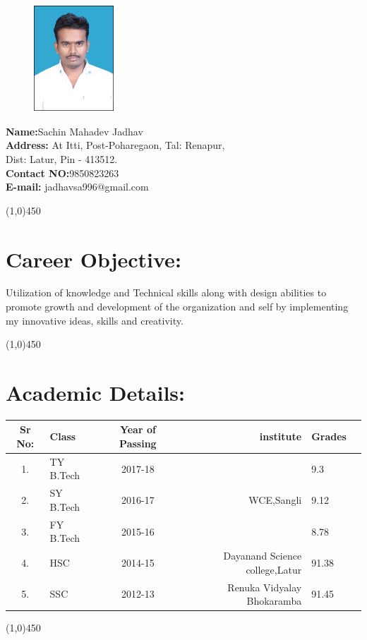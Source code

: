 \documentclass[16pt,a4paper]{article}
\begin{document}
 \begin{figure}
 	\vspace{-60pt}
    \includegraphics[width=3cm,height=4cm]{said.jpg}
 \end{figure}
		\textbf{Name:}Sachin Mahadev Jadhav\\
        \textbf{Address:} At Itti, Post-Poharegaon, Tal: Renapur,\\ Dist: Latur, Pin - 413512.\\
        \textbf{Contact NO:}9850823263\\
        \textbf{E-mail:} {jadhavsa996@gmail.com} 
       \begin{center}
       	 \line(1,0){450}
       \end{center}
     \section{Career Objective:} 
 	  Utilization of knowledge and Technical skills along with design abilities to promote growth and development of the organization and self by implementing my innovative ideas, skills and creativity.
   \begin{center}
   	\line(1,0){450}
   \end{center}
 \section{Academic Details:} 
\begin{tabular}{||c|l|c|r|l|l||}
	\hline
	Sr No:& Class & Year of Passing  & institute &Grades \\
	\hline
	1.&	TY B.Tech & 2017-18 &\multirow{3}{*}{WCE,Sangli}&9.3  \\
	2.&	SY B.Tech & 2016-17 &  &9.12 \\
	3.&	FY B.Tech & 2015-16 &  &8.78 \\
	4.&	HSC & 2014-15 & Dayanand Science college,Latur &91.38 \\
	5.&	SSC & 2012-13 & Renuka Vidyalay Bhokaramba &91.45 \\
	\hline
\end{tabular}
\begin{center}
	\line(1,0){450}
\end{center}
\end{document}
